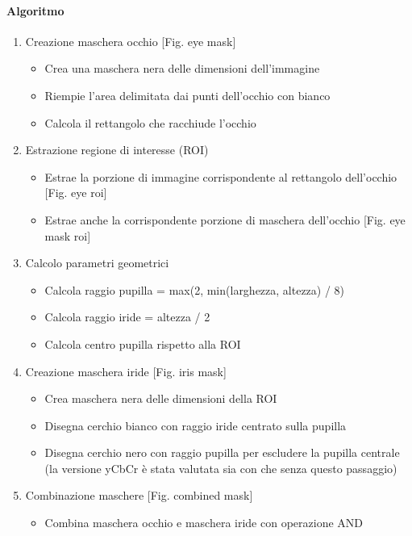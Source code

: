 \documentclass[12pt,a4paper,openright,twoside]{book}
\begin{document}
\paragraph{Algoritmo}
\begin{enumerate}
    \item Creazione maschera occhio [Fig. eye mask] \begin{itemize}
        \item Crea una maschera nera delle dimensioni dell'immagine
        \item Riempie l'area delimitata dai punti dell'occhio con bianco
        \item Calcola il rettangolo che racchiude l'occhio
    \end{itemize}
    \item Estrazione regione di interesse (ROI) \begin{itemize}
        \item Estrae la porzione di immagine corrispondente al rettangolo dell'occhio [Fig. eye roi]
        \item Estrae anche la corrispondente porzione di maschera dell'occhio [Fig. eye mask roi]
    \end{itemize}
    \item Calcolo parametri geometrici \begin{itemize}
        \item Calcola raggio pupilla = max(2, min(larghezza, altezza) / 8)
        \item Calcola raggio iride = altezza / 2
        \item Calcola centro pupilla rispetto alla ROI
    \end{itemize}
    \item Creazione maschera iride [Fig. iris mask] \begin{itemize}
        \item Crea maschera nera delle dimensioni della ROI
        \item Disegna cerchio bianco con raggio iride centrato sulla pupilla
        \item Disegna cerchio nero con raggio pupilla per escludere la pupilla centrale (la versione yCbCr è stata valutata sia con che senza questo passaggio)
    \end{itemize}
    \item Combinazione maschere [Fig. combined mask] \begin{itemize}
        \item Combina maschera occhio e maschera iride con operazione AND

\end{itemize}
\end{enumerate}
\end{document}
